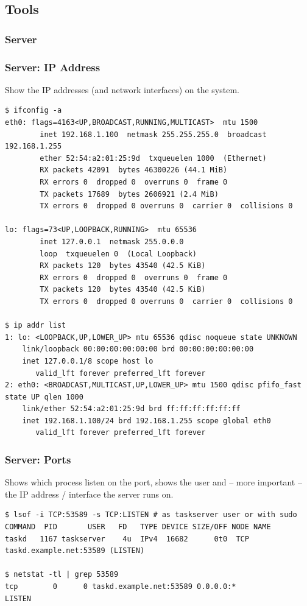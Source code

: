 \documentclass[t,handout]{beamer}
\begin{document}
\subsection{Tools}

\subsubsection{Server}

\begin{frame}[fragile]\frametitle{Server: IP Address}\label{S1}
    \vfill
    Show the IP addresses (and network interfaces) on the system.
    \begin{lstlisting}
$ ifconfig -a
eth0: flags=4163<UP,BROADCAST,RUNNING,MULTICAST>  mtu 1500
        inet 192.168.1.100  netmask 255.255.255.0  broadcast 192.168.1.255
        ether 52:54:a2:01:25:9d  txqueuelen 1000  (Ethernet)
        RX packets 42091  bytes 46300226 (44.1 MiB)
        RX errors 0  dropped 0  overruns 0  frame 0
        TX packets 17689  bytes 2606921 (2.4 MiB)
        TX errors 0  dropped 0 overruns 0  carrier 0  collisions 0

lo: flags=73<UP,LOOPBACK,RUNNING>  mtu 65536
        inet 127.0.0.1  netmask 255.0.0.0
        loop  txqueuelen 0  (Local Loopback)
        RX packets 120  bytes 43540 (42.5 KiB)
        RX errors 0  dropped 0  overruns 0  frame 0
        TX packets 120  bytes 43540 (42.5 KiB)
        TX errors 0  dropped 0 overruns 0  carrier 0  collisions 0

$ ip addr list
1: lo: <LOOPBACK,UP,LOWER_UP> mtu 65536 qdisc noqueue state UNKNOWN
    link/loopback 00:00:00:00:00:00 brd 00:00:00:00:00:00
    inet 127.0.0.1/8 scope host lo
       valid_lft forever preferred_lft forever
2: eth0: <BROADCAST,MULTICAST,UP,LOWER_UP> mtu 1500 qdisc pfifo_fast state UP qlen 1000
    link/ether 52:54:a2:01:25:9d brd ff:ff:ff:ff:ff:ff
    inet 192.168.1.100/24 brd 192.168.1.255 scope global eth0
       valid_lft forever preferred_lft forever\end{lstlisting}
    \vfill
\end{frame}

\begin{frame}[fragile]\frametitle{Server: Ports}\label{S2}
    \vfill
    Shows which process listen on the port, shows the user and -- more important -- the IP address / interface the server runs on.
    \begin{lstlisting}
$ lsof -i TCP:53589 -s TCP:LISTEN # as taskserver user or with sudo
COMMAND  PID       USER   FD   TYPE DEVICE SIZE/OFF NODE NAME
taskd   1167 taskserver    4u  IPv4  16682      0t0  TCP taskd.example.net:53589 (LISTEN)

$ netstat -tl | grep 53589
tcp        0      0 taskd.example.net:53589 0.0.0.0:*               LISTEN\end{lstlisting}
    \vfill
\end{frame}
\end{document}
